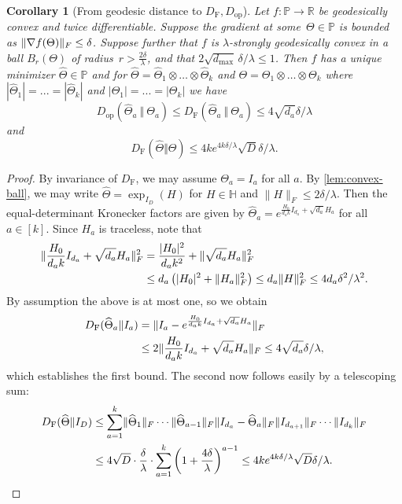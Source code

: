 \documentclass[aos]{imsart}
\newtheorem{corollary}[theorem]{Corollary}
\theoremstyle{definition}
\numberwithin{equation}{section}
\DeclarePairedDelimiter{\abs}{\lvert}{\rvert}
\DeclarePairedDelimiter{\norm}{\lVert}{\rVert}
\newcommand{\R}{{\mathbb{R}}}
\renewcommand{\P}{{\mathbb{P}}}
\renewcommand{\H}{{\mathbb{H}}}
\newcommand{\htheta}{\widehat{\Theta}}
\newcommand{\ot}{\otimes}
\newcommand{\eps}{\varepsilon}
\newcommand{\DF}{D_{\operatorname{F}}}
\newcommand{\Dop}{D_{\operatorname{op}}}
\def\dmax{d_{\max}}
\begin{document}
\begin{corollary}[From geodesic distance to $\DF, \Dop$] \label{cor:g-convex-components}
Let $f\colon \P \to \R$ be geodesically convex and twice differentiable.
Suppose the gradient at some~$\Theta\in\P$ is bounded as $\norm{\nabla f(\Theta)}_F \leq \delta$. Suppose further that $f$ is $\lambda$-strongly geodesically convex in a ball $B_r(\Theta)$ of radius~$r > \frac{2\delta}\lambda$, and that $2 \sqrt{\dmax} \, \delta/\lambda \leq 1$. Then $f$ has a unique minimizer $\htheta \in \P$ and for $\htheta = \htheta_1 \ot \dots \ot \htheta_k$ and $\Theta = \Theta_1 \ot \dots \ot \Theta_k$ where $|\htheta_1| =... = |\htheta_k|$ and $|\Theta_1| =... = |\Theta_k|$ we have
$$ \Dop(\htheta_a \ \Vert  \ \Theta_a) \leq \DF(\htheta_a \ \Vert  \ \Theta_a) \leq 4 \sqrt{d_a} \delta/\lambda$$
and
$$ \DF(\htheta\Vert  \Theta) \leq 4 k e^{4k \delta/\lambda} \sqrt{D} \delta /\lambda.$$
\end{corollary}
\begin{proof}
By invariance of $\DF$, we may assume $\Theta_a = I_a$ for all $a$.
By \cref{lem:convex-ball}, we may write $\htheta = \exp_{I_D}(H) $ for $H \in \H$ and $\|H\|_F \leq 2\delta/\lambda$.
Then the equal-determinant Kronecker factors are given by $\htheta_a = e^{\frac{H_0}{d_a k} I_{d_a} + \sqrt{d_a} H_a}$ for all~$a\in[k]$.
Since $H_a$ is traceless, note that
\begin{align*}
\norm{\frac{H_0}{d_a k} I_{d_a} + \sqrt{d_a} H_a}_F^2
&= \frac{\abs{H_0}^2}{d_a k^2} + \norm{\sqrt{d_a} H_a}_F^2 \\
&\leq d_a \left( \abs{H_0}^2 + \norm{H_a}_F^2 \right)
\leq d_a \norm H_F^2
\leq 4 d_a \delta^2/\lambda^2.
\end{align*}
By assumption the above is at most one, so we obtain
\begin{align*}
  \DF(\htheta_a\Vert I_a)
&= \norm{I_a - e^{\frac{H_0}{d_a k} I_{d_a} + \sqrt{d_a} H_a}}_F\\
&\leq 2 \norm{\frac{H_0}{d_a k} I_{d_a} + \sqrt{d_a} H_a}_F \leq 4 \sqrt{d_a} \delta/\lambda,
\end{align*}
which establishes the first bound.
The second now follows easily by a telescoping sum:
\begin{align*}
 \DF(\htheta\Vert I_D)
&\leq \sum_{a=1}^k \norm{\htheta_1}_F \cdots \norm{\htheta_{a-1}}_F \norm{I_{d_a} - \htheta_a}_F \norm{I_{d_{a+1}}}_F \cdots \norm{I_{d_k}}_F \\
&\leq  4\sqrt{D} \cdot \dfrac{\delta}{\lambda} \cdot \sum_{a=1}^k \left(1 +  \dfrac{4\delta}{\lambda}\right)^{a-1}
\leq  4 k e^{4k \delta/\lambda} \sqrt{D} \delta /\lambda.
\end{align*}\qedhere

\end{proof}
\end{document}
